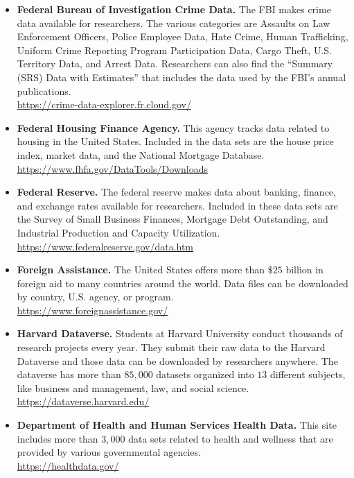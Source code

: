 \begin{itemize}
	\item \textbf{Federal Bureau of Investigation Crime Data.} The FBI makes crime data available for researchers. The various categories are Assaults on Law Enforcement Officers, Police Employee Data, Hate Crime, Human Trafficking, Uniform Crime Reporting Program Participation Data, Cargo Theft, U.S. Territory Data, and Arrest Data. Researchers can also find the ``Summary (SRS) Data with Estimates'' that includes the data used by the FBI's annual publications.
	\\ \url{https://crime-data-explorer.fr.cloud.gov/}

	\item \textbf{Federal Housing Finance Agency.} This agency tracks data related to housing in the United States. Included in the data sets are the house price index, market data, and the National Mortgage Database. 
	\\ \url{https://www.fhfa.gov/DataTools/Downloads}

	\item \textbf{Federal Reserve.} The federal reserve makes data about banking, finance, and exchange rates available for researchers. Included in these data sets are the Survey of Small Business Finances, Mortgage Debt Outstanding, and Industrial Production and Capacity Utilization.  
	\\ \url{https://www.federalreserve.gov/data.htm}

	\item \textbf{Foreign Assistance.} The United States offers more than $ \$25 $ billion in foreign aid to many countries around the world. Data files can be downloaded by country, U.S. agency, or program. 
	\\ \url{https://www.foreignassistance.gov/}

	\item \textbf{Harvard Dataverse.} Students at Harvard University conduct thousands of research projects every year. They submit their raw data to the Harvard Dataverse and those data can be downloaded by researchers anywhere. The dataverse has more than $ 85,000 $ datasets organized into $ 13 $ different subjects, like business and management, law, and social science.  
	\\ \url{https://dataverse.harvard.edu/}

	\item \textbf{Department of Health and Human Services Health Data.} This site includes more than $ 3,000 $ data sets related to health and wellness that are provided by various governmental agencies.
	\\ \url{https://healthdata.gov/}


\end{itemize}
